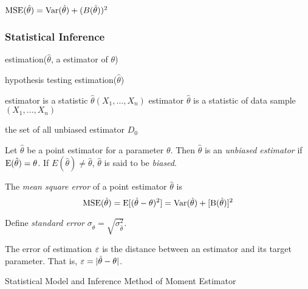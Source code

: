 $\mathrm{MSE}(\hat\theta)=\mathrm{Var}(\hat\theta)+(B(\hat\theta))^2$

\subsubsection{Statistical Inference}
estimation($\hat \theta$, a estimator of $\theta$)

hypothesis testing estimation($\hat \theta$)


estimator is a statistic $\hat \theta(X_1,\ldots,X_n)$
estimator $\hat \theta$ is a statistic of data sample $(X_1,\ldots,X_n)$



the set of all unbiased estimator $D_0$


Let $\hat{\theta}$ be a point estimator for a parameter $\theta$. Then $\hat{\theta}$ is an \textit{unbiased estimator} if $\mathrm{E}(\hat{\theta}) = \theta$. If $E(\hat{\theta}) \neq \hat{\theta}$, $\hat{\theta}$ is said to be \textit{biased}.


The \textit{mean square error} of a point estimator $\hat{\theta}$ is
\[\mathrm{MSE}(\hat{\theta})=\mathrm{E}[(\hat{\theta}-\theta)^2]=\mathrm{Var}(\hat{\theta})+ [\mathrm{B}(\hat{\theta})]^2\]

Define \textit{standard error} $\sigma_{\hat\theta}=\sqrt{\sigma^2_{\hat\theta}}$.


The error of estimation $\varepsilon$ is the distance between an estimator and its target parameter. That is, $\varepsilon = |\hat{\theta}-\theta|$.


Statistical Model and Inference
Method of Moment Estimator